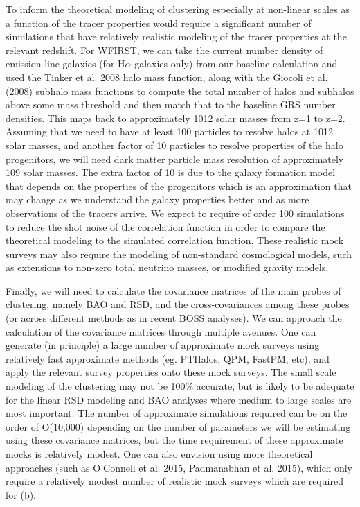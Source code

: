  To inform the theoretical modeling of clustering especially at non-linear
 scales as a function of the tracer properties would require a significant number
 of simulations that have relatively realistic modeling of the tracer properties
 at the relevant redshift.  For WFIRST, we can take the current number density of
 emission line galaxies (for H$\alpha$ galaxies only) from our baseline
 calculation and used the Tinker et al. 2008 halo mass function, along with the
 Giocoli et al. (2008) subhalo mass functions to compute the total number of
 halos and subhalos above some mass threshold and then match that to the baseline
 GRS number densities. This maps back to approximately 1012 solar masses from z=1
 to z=2. Assuming that we need to have at least 100 particles to resolve halos at
 1012 solar masses, and another factor of 10 particles to resolve properties of
 the halo progenitors, we will need dark matter particle mass resolution of
 approximately 109 solar masses. The extra factor of 10 is due to the galaxy
 formation model that depends on the properties of the progenitors which is an
 approximation that may change as we understand the galaxy properties better and
 as more observations of the tracers arrive. We expect to require of order 100
 simulations to reduce the shot noise of the correlation function in order to
 compare the theoretical modeling to the simulated correlation function. These
 realistic mock surveys may also require the modeling of non-standard
 cosmological  models, such as extensions to non-zero total neutrino masses, or
 modified gravity models.

 Finally, we will need to calculate the covariance matrices of the main probes of
 clustering, namely BAO and RSD, and the cross-covariances among these probes
 (or across different methods as in recent BOSS analyses). We can approach the
 calculation of the covariance matrices through multiple avenues. One can
 generate (in principle) a large number of approximate mock surveys using
 relatively fast approximate methods (eg. PTHalos, QPM, FastPM, etc), and apply
 the relevant survey properties onto these mock surveys. The small scale modeling
 of the clustering may not be 100\% accurate, but is likely to be adequate for
 the linear RSD modeling and BAO analyses where medium to large scales are most
 important. The number of approximate simulations required can be on the order of
 O(10,000) depending on the number of parameters we will be estimating using
 these covariance matrices, but the time requirement of these approximate mocks
 is relatively modest. One can also envision using more theoretical approaches
 (such as O'Connell et al. 2015, Padmanabhan et al. 2015), which only require a
 relatively modest number of realistic mock surveys which are required for (b).


